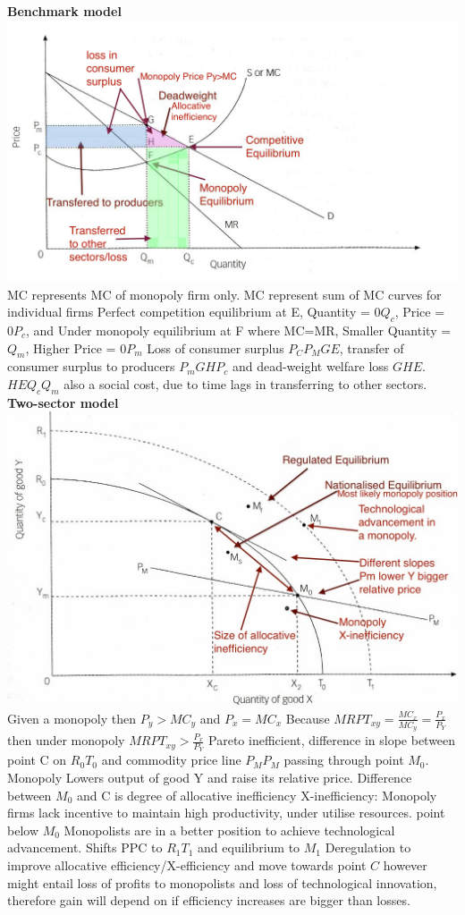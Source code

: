 \documentclass[12pt]{examnotes}
\begin{document}
{\bf Benchmark model}
\includegraphics[scale=0.4]{./imgs/41.jpg}
\ra MC represents MC of monopoly firm only. MC represent sum of MC curves for individual firms
\ra Perfect competition equilibrium at E, Quantity = $0Q_c$, Price = $0P_c$, and 
\ra Under monopoly equilibrium at F where  MC=MR, Smaller Quantity = $Q_m$, Higher Price = $0P_m$ 
\ra Loss of consumer surplus $P_CP_MGE$,  transfer of consumer surplus to producers $P_mGHP_c$ and dead-weight welfare loss $GHE$. $HEQ_cQ_m$ also a social cost, due to time lags in transferring to other sectors.
\vspace{6pt}
{\bf Two-sector model}
\includegraphics[scale=0.4]{./imgs/42.jpg}
\ra Given a monopoly then $P_y > MC_y$ and $P_x=MC_x$
\ra Because $MRPT_{xy} = \frac{MC_x}{MC_y} = \frac{P_x}{P_Y}$ then under monopoly $MRPT_{xy} > \frac{P_x}{P_Y}$ 
\ra Pareto inefficient, difference in slope between point C on $R_0T_0$ and commodity price line $P_MP_M$ passing through point $M_0$.
\ra Monopoly Lowers output of good Y and raise its relative price.
\ra Difference between $M_0$ and C is degree of allocative inefficiency
\ra X-inefficiency: Monopoly firms lack incentive to maintain high productivity, under utilise resources. point below $M_0$ 
\ra Monopolists are in a better position to achieve technological advancement. Shifts PPC to $R_1T_1$ and equilibrium to $M_1$
\ra Deregulation to improve allocative efficiency/X-efficiency and move towards point $C$ however might entail loss of profits to monopolists and loss of technological innovation, therefore gain will depend on if efficiency increases are bigger than losses. 
\end{document}
